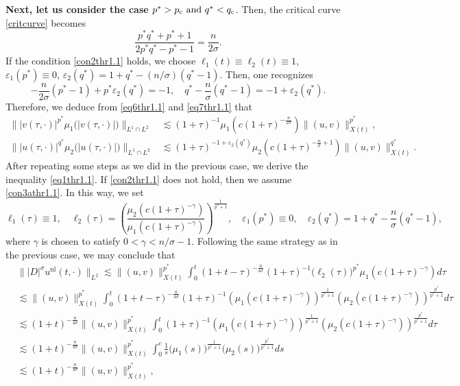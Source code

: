 \documentclass[11pt,reqno]{amsart}
\newcommand{\tron}[1]{\left( #1 \right)}
\numberwithin{equation}{section}
\begin{document}
{\bf Next, let us consider the case $p^*>p_{\rm c}\text{ and }q^*<q_{\rm c}$}. Then, the critical curve \eqref{critcurve} becomes
\begin{equation}\label{critcurvecase2}
    \frac{p^*q^*+p^*+1}{2p^*q^*-p^*-1}=\frac{n}{2\sigma}.
\end{equation}
\noindent If the condition \eqref{con2thr1.1} holds, we choose $\ell_1(t)\equiv \ell_2(t)\equiv 1$, $\varepsilon_1(p^*)\equiv 0$, $\varepsilon_2(q^*)=1+q^*-(n/\sigma)(q^*-1)$. Then, one recognizes
\begin{equation}
-\frac{n}{2\sigma}\left(p^*-1\right)+p^*\varepsilon_2(q^*)=-1, \quad q^*-\frac{n}{\sigma}\left(q^*-1\right)=-1+\varepsilon_2(q^*).
\end{equation}
Therefore, we deduce from \eqref{eq6thr1.1} and \eqref{eq7thr1.1} that
\begin{align}
\big\||v(\tau, \cdot)|^{p^*} \mu_1\big(|v(\tau, \cdot)|\big)\big\|_{L^1\cap L^2}&\lesssim (1+\tau)^{-1}\mu_1\tron{c(1+\tau)^{-\frac{n}{2\sigma}}}\|(u,v)\|^{p^*}_{X(t)},\label{eq18thr1.1}\\
\big\||u(\tau, \cdot)|^{q^*} \mu_2\big(|u(\tau, \cdot)|\big)\big\|_{L^1 \cap L^2}&\lesssim (1+\tau)^{-1+\varepsilon_2(q^*)}\mu_2\tron{c(1+\tau)^{-\frac{n}{\sigma}+1}}\|(u,v)\|^{q^*}_{X(t)}.\label{eq19thr1.1}
\end{align}
After repeating some steps as we did in the previous case, we derive the inequality \eqref{eq1thr1.1}. If \eqref{con2thr1.1} does not hold, then we assume \eqref{con3athr1.1}. In this way, we set
$$
\ell_1(\tau)\equiv 1,\quad  \ell_2(\tau)=\left(\frac{\mu_2\left(c(1+\tau)^{-\gamma}\right)}{\mu_1\left(c(1+\tau)^{-\gamma}\right)}\right)^{\frac{1}{p^*+1}},\quad \varepsilon_1(p^*)\equiv 0,\quad  \varepsilon_2(q^*)=1+q^*-\frac{n}{\sigma}(q^*-1),
$$
where $\gamma$ is chosen to satisfy $0 < \gamma < n/\sigma-1$. Following the same strategy as in the previous case, we may conclude that
\begin{align}
& \big\||D|^{\sigma}u^{\mathrm{nl}}(t, \cdot)\big\|_{L^2}\lesssim\|(u, v)\|_{X(t)}^{p^*} \int_0^t(1+t-\tau)^{-\frac{n}{4\sigma}}(1+\tau)^{-1} \big(\ell_2(\tau)\big)^{p^*}\mu_1\left(c(1+\tau)^{-\gamma}\right) d \tau\nonumber\\
& \lesssim\|(u, v)\|_{X(t)}^{p^*}\int_0^t(1+t-\tau)^{-\frac{n}{4\sigma}}(1+\tau)^{-1}\left(\mu_1\left(c(1+\tau)^{-\gamma}\right)\right)^{\frac{1}{p^*+1}}\left(\mu_2\left(c(1+\tau)^{-\gamma}\right)\right)^{\frac{p^*}{p^*+1}} d \tau\nonumber\\
&\lesssim(1+t)^{-\frac{n}{4\sigma}}\|(u, v)\|_{X(t)}^{p^*}\int_0^t(1+\tau)^{-1}\left(\mu_1\left(c(1+\tau)^{-\gamma}\right)\right)^{\frac{1}{p^*+1}}\left(\mu_2\left(c(1+\tau)^{-\gamma}\right)\right)^{\frac{p^*}{p^*+1}} d \tau\nonumber\\
&\lesssim (1+t)^{-\frac{n}{4\sigma}}\|(u, v)\|_{X(t)}^{p^*} \int_0^c \frac{1}{s}\big(\mu_1(s)\big)^{\frac{1}{p^*+1}}\big(\mu_2(s)\big)^{\frac{p^*}{p^*+1}} d s\nonumber\\
&\lesssim(1+t)^{-\frac{n}{4\sigma}}\|(u, v)\|_{X(t)}^{p^*},\label{eq20thr1.1}
\end{align}
\end{document}
